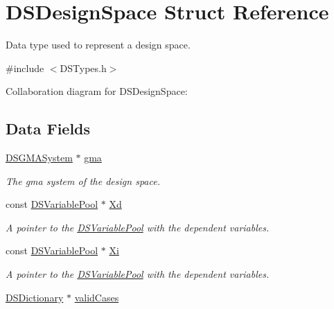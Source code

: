 \hypertarget{struct_d_s_design_space}{
\section{DSDesignSpace Struct Reference}
\label{struct_d_s_design_space}
}


Data type used to represent a design space.  




{\ttfamily \#include $<$DSTypes.h$>$}



Collaboration diagram for DSDesignSpace:\subsection*{Data Fields}
\begin{DoxyCompactItemize}
\item 
\hypertarget{struct_d_s_design_space_ace45d99580d7db1513538aeb7678b6db}{
\hyperlink{struct_d_s_g_m_a_system}{DSGMASystem} $\ast$ \hyperlink{struct_d_s_design_space_ace45d99580d7db1513538aeb7678b6db}{gma}}
\label{struct_d_s_design_space_ace45d99580d7db1513538aeb7678b6db}

\begin{DoxyCompactList}\small\item\em The gma system of the design space. \item\end{DoxyCompactList}\item 
\hypertarget{struct_d_s_design_space_a739550585a18a79b3f809fc0b0d2658b}{
const \hyperlink{struct_d_s_variable_pool}{DSVariablePool} $\ast$ \hyperlink{struct_d_s_design_space_a739550585a18a79b3f809fc0b0d2658b}{Xd}}
\label{struct_d_s_design_space_a739550585a18a79b3f809fc0b0d2658b}

\begin{DoxyCompactList}\small\item\em A pointer to the \hyperlink{struct_d_s_variable_pool}{DSVariablePool} with the dependent variables. \item\end{DoxyCompactList}\item 
\hypertarget{struct_d_s_design_space_a00cfed7027afc5b8218687b951287742}{
const \hyperlink{struct_d_s_variable_pool}{DSVariablePool} $\ast$ \hyperlink{struct_d_s_design_space_a00cfed7027afc5b8218687b951287742}{Xi}}
\label{struct_d_s_design_space_a00cfed7027afc5b8218687b951287742}

\begin{DoxyCompactList}\small\item\em A pointer to the \hyperlink{struct_d_s_variable_pool}{DSVariablePool} with the dependent variables. \item\end{DoxyCompactList}\item 
\hypertarget{struct_d_s_design_space_ac9ccac5ae8d5a9b6255b2bb394d90b53}{
\hyperlink{struct_d_s_dictionary}{DSDictionary} $\ast$ \hyperlink{struct_d_s_design_space_ac9ccac5ae8d5a9b6255b2bb394d90b53}{validCases}}
\label{struct_d_s_design_space_ac9ccac5ae8d5a9b6255b2bb394d90b53}


\end{DoxyCompactItemize}
